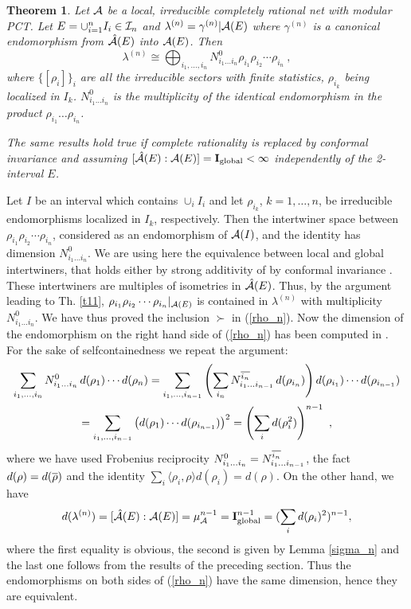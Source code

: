 \documentclass[12pt]{article}
\def\proof{\trivlist \item[\hskip \labelsep{\bf Proof\ }]}
\newtheorem{theorem}{Theorem}
\def\A{{\cal A}}
\def\I{{\cal I}}
\def\In{{\bf{I}}}
\begin{document}
\begin{theorem}\label{mce} Let $\A$ be a local, irreducible
completely rational net with modular PCT.
Let $E=\cup_{i=1}^n I_i\in\I_n$ and
$\lambda^{(n)}=\gamma^{(n)}\vert \A(E)$ where $\gamma^{(n)}$ is a canonical
endomorphism from $\hat{\A}(E)$ into $\A(E)$. Then
\begin{equation}
 \lambda^{(n)}\cong\bigoplus_{i_1,\ldots,i_n} N_{i_1
 \ldots i_n}^0 \rho_{i_1}\rho_{i_2}\cdots\rho_{i_n}\ ,
   \label{rho_n}
\end{equation}
where $\{[\rho_i]\}_i$ are all the irreducible sectors with
finite statistics,
$\rho_{i_k}$ being localized in $I_k$.
$N_{i_1\ldots i_n}^0$ is the
multiplicity of the
identical endomorphism in the product $\rho_{i_1}\ldots\rho_{i_n}$.

The same results hold true if complete rationality is replaced by
conformal invariance and assuming $[\hat\A(E):\A(E)]=\In_{\rm global} <\infty$
independently of the 2-interval $E$.
\end{theorem}
\proof Let $I$ be an interval which contains $\cup_i I_i$ and let
$\rho_{i_k}$, $k=1,\ldots,n$, be irreducible
endomorphisms localized in $I_k$, respectively.
Then the intertwiner space between $\rho_{i_1}\rho_{i_2}\cdots
\rho_{i_n}$, considered as an
endomorphism of $\A(I)$, and the identity has dimension
$N_{i_1\ldots i_n}^0$. We are using here the equivalence between
local and global intertwiners, that holds either by strong additivity
of by conformal invariance \cite{GL}.
These intertwiners are multiples of isometries in $\hat{\A}(E)$.
Thus, by the argument leading to
Th. \ref{t11}, $\rho_{i_1}\rho_{i_2}\cdots\rho_{i_n}\vert_{\A(E)}$
is contained in $\lambda^{(n)}$ with
multiplicity $N_{i_1\ldots i_n}^0$. We have thus
proved the inclusion $\succ$ in (\ref{rho_n}).
Now the dimension of the endomorphism on the right hand side of
(\ref{rho_n}) has been
computed in \cite{X2}. For the sake of selfcontainedness we repeat the argument:
\begin{multline}
\sum_{i_1,\ldots,i_n} N_{i_1\ldots i_n}^0\,d({\rho_1})\cdots
   d({\rho_n}) =\sum_{i_1,\ldots,i_{n-1}} \left (\sum_{i_n}
   N_{i_1\ldots i_{n-1}}^{\overline{i_n}}\,d(\rho_{i_n})\right )
   d(\rho_{i_1})\cdots d(\rho_{i_{n-1}} )\\
     = \sum_{i_1,\ldots,i_{n-1}}\left (d({\rho_1})\cdots
   d(\rho_{i_{n-1}})\right )^2= \left (\sum_i d(\rho_i^2)\right )^{n-1} \ ,
\end{multline}
where we have used Frobenius reciprocity
$N_{i_1\ldots i_n}^0=
N_{i_1\ldots i_{n-1}}^{\overline{i_n}}$, the fact
$d(\rho)=d({\overline{\rho}})$ and the identity
$\sum_i \langle \rho_i,\rho\rangle d(\rho_i)=d(\rho)$.
On the other hand, we have
\[
d(\lambda^{(n)})=[\hat{\A}(E):\A(E)]=\mu_\A^{n-1}=\In_{\rm global}^{n-1}=
(\sum_i d(\rho_i)^2)^{n-1},
\]
where the first equality is obvious, the second is given by Lemma
\ref{sigma_n} and the last one follows from the results of the preceding
section. Thus the endomorphisms on
both sides of (\ref{rho_n}) have the same dimension, hence they are
equivalent.
\end{document}
